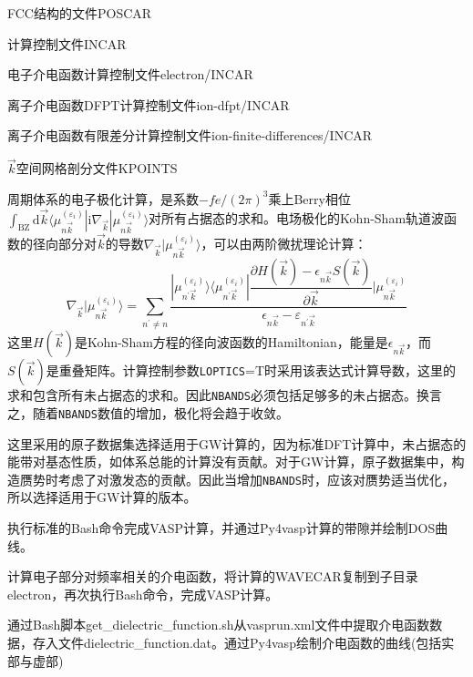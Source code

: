 \textrm{FCC}结构的文件\textrm{POSCAR}

计算控制文件\textrm{INCAR}

电子介电函数计算控制文件\textrm{electron/INCAR}

离子介电函数\textrm{DFPT}计算控制文件\textrm{ion-dfpt/INCAR}

离子介电函数有限差分计算控制文件\textrm{ion-finite-differences/INCAR}

$\vec k$空间网格剖分文件\textrm{KPOINTS}

周期体系的电子极化计算，是系数$-fe/(2\pi)^3$乘上\textrm{Berry}相位$\int_{\mathrm{BZ}}\mathrm{d}\vec k\langle\mu_{n\vec k}^{(\varepsilon_i)}|\mathrm{i}\nabla_{\vec k}|\mu_{n\vec k}^{(\varepsilon_i)}\rangle$对所有占据态的求和。电场极化的\textrm{Kohn-Sham}轨道波函数的径向部分对$\vec k$的导数$\nabla_{\vec k}|\mu_{n\vec k}^{(\varepsilon_i)}\rangle$，可以由两阶微扰理论计算：
\begin{displaymath}
	\nabla_{\vec k}|\mu_{n\vec k}^{(\varepsilon_i)}\rangle=\sum_{n^{\prime}\neq n}\dfrac{|\mu_{n^{\prime}\vec k}^{(\varepsilon_i)}\rangle\langle\mu_{n^{\prime}\vec k}^{(\varepsilon_i)}|\dfrac{\partial H(\vec k)-\epsilon_{n\vec k}S(\vec k)}{\partial\vec k}|\mu_{n\vec k}^{(\varepsilon_i)}}{\epsilon_{n\vec k}-\varepsilon_{n^{\prime}\vec k}}
\end{displaymath}
这里$H(\vec k)$是\textrm{Kohn-Sham}方程的径向波函数的\textrm{Hamiltonian}，能量是$\epsilon_{n\vec k}$，而$S(\vec k)$是重叠矩阵。计算控制参数\texttt{LOPTICS}=\textrm{T}时采用该表达式计算导数，这里的求和包含所有未占据态的求和。因此\texttt{NBANDS}必须包括足够多的未占据态。换言之，随着\texttt{NBANDS}数值的增加，极化将会趋于收敛。

这里采用的原子数据集选择适用于\textrm{GW}计算的，因为标准\textrm{DFT}计算中，未占据态的能带对基态性质，如体系总能的计算没有贡献。对于\textrm{GW}计算，原子数据集中，构造赝势时考虑了对激发态的贡献。因此当增加\texttt{NBANDS}时，应该对赝势适当优化，所以选择适用于\textrm{GW}计算的版本。

执行标准的\textrm{Bash}命令完成\textrm{VASP}计算，并通过\textrm{Py4vasp}计算的带隙并绘制\textrm{DOS}曲线。

计算电子部分对频率相关的介电函数，将计算的\textrm{WAVECAR}复制到子目录\textrm{electron}，再次执行\textrm{Bash}命令，完成\textrm{VASP}计算。

通过\textrm{Bash}脚本\textrm{get\_dielectric\_function.sh}从\textrm{vasprun.xml}文件中提取介电函数数据，存入文件\textrm{dielectric\_function.dat}。通过\textrm{Py4vasp}绘制介电函数的曲线(包括实部与虚部)

